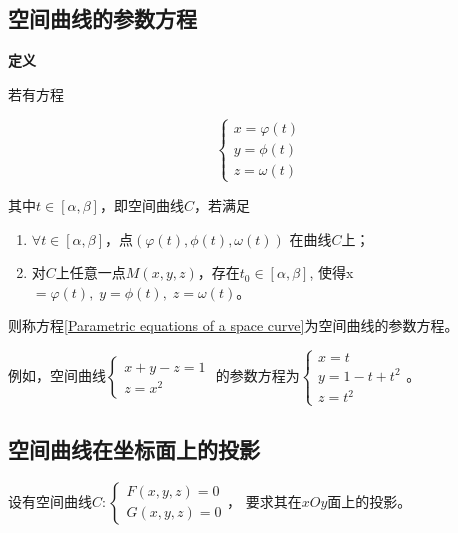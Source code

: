 \documentclass[
	11pt, %
	a4paper, %
]{WhuSakuraBook}
\begin{document}
\subsection{空间曲线的参数方程}

    \textbf{定义}

    若有方程

    \begin{equation}
        \left\{\begin{array}{l}
        x=\varphi\left(t\right) \\
        y=\phi\left(t\right) \\
        z=\omega\left(t\right)
        \end{array}\right.
        \label{Parametric equations of a space curve}
    \end{equation}

    其中\(t \in \left[\alpha, \beta\right]\)，即空间曲线\(C\)，若满足

    \begin{enumerate}
        \item \(\forall t \in \left[\alpha, \beta\right]\)，点\(\left(
            \varphi\left(t\right),\phi\left(t\right),\omega\left(t\right)\right)\)
            在曲线\(C\)上；
        \item 对\(C\)上任意一点\(M\left(x,y,z\right)\)，存在\(t_0 \in \left[\alpha, \beta\right]\),
            使得x\(=\varphi\left(t\right),\; y=\phi\left(t\right),\; z=\omega\left(t\right)\)。
    \end{enumerate}

    则称方程\ref{Parametric equations of a space curve}为空间曲线的参数方程。

    例如，空间曲线$\left\{\begin{array}{c}x+y-z=1 \\ z=x^2\end{array}\right.$
    的参数方程为$\left\{\begin{array}{l}x=t \\ y=1-t+t^2 \\ z=t^2\end{array}\right.$。

\subsection{空间曲线在坐标面上的投影}

    设有空间曲线$C: \left\{\begin{array}{l} F(x, y, z)=0 \\ G(x, y, z)=0 \end{array}\right.$，
    要求其在\(xOy\)面上的投影。
\end{document}
